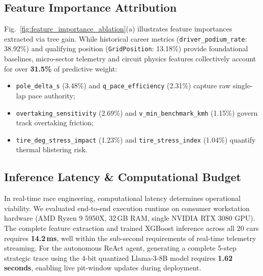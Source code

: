 \documentclass[journal]{IEEEtran}
\begin{document}
\subsection{Feature Importance Attribution}
Fig.~\ref{fig:feature_importance_ablation}(a) illustrates feature importances extracted via tree gain. While historical career metrics (\texttt{driver\_podium\_rate}: 38.92\%) and qualifying position (\texttt{GridPosition}: 13.18\%) provide foundational baselines, micro-sector telemetry and circuit physics features collectively account for over \textbf{31.5\%} of predictive weight:
\begin{itemize}
    \item \texttt{pole\_delta\_s} (3.48\%) and \texttt{q\_pace\_efficiency} (2.31\%) capture raw single-lap pace authority;
    \item \texttt{overtaking\_sensitivity} (2.69\%) and \texttt{v\_min\_benchmark\_kmh} (1.15\%) govern track overtaking friction;
    \item \texttt{tire\_deg\_stress\_impact} (1.23\%) and \texttt{tire\_stress\_index} (1.04\%) quantify thermal blistering risk.
\end{itemize}

\subsection{Inference Latency \& Computational Budget}
In real-time race engineering, computational latency determines operational viability. We evaluated end-to-end execution runtime on consumer workstation hardware (AMD Ryzen 9 5950X, 32\,GB RAM, single NVIDIA RTX 3080 GPU). The complete feature extraction and trained XGBoost inference across all 20 cars requires \textbf{14.2\,ms}, well within the sub-second requirements of real-time telemetry streaming. For the autonomous ReAct agent, generating a complete 5-step strategic trace using the 4-bit quantized Llama-3-8B model requires \textbf{1.62 seconds}, enabling live pit-window updates during deployment.
\end{document}
